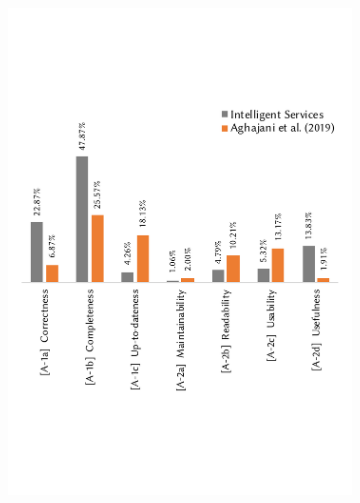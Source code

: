 \begin{figure}[t]
  \centering
  \begin{subfigure}[c]{0.49\linewidth}
    \centering
    \includegraphics[width=\linewidth]{a-compare.pdf}
  \end{subfigure}
  \hfill
  \begin{subfigure}[c]{0.49\linewidth}
    \centering

\end{subfigure}
\end{figure}
